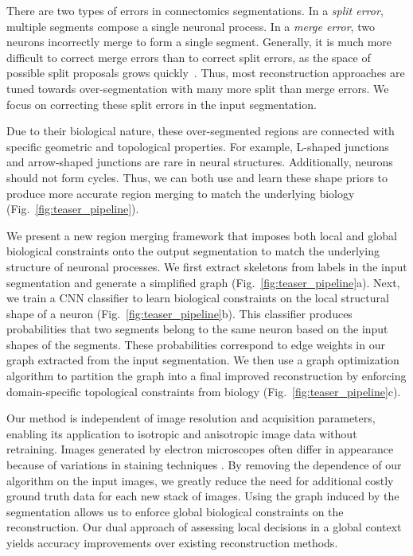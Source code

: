 There are two types of errors in connectomics segmentations.
In a \textit{split error}, multiple segments compose a single neuronal process. 
In a \textit{merge error}, two neurons incorrectly merge to form a single segment. 
Generally, it is much more difficult to correct merge errors than to correct split errors, as the space of possible split proposals grows quickly~\cite{parag2015properties}.
Thus, most reconstruction approaches are tuned towards over-segmentation with many more split than merge errors.
We focus on correcting these split errors in the input segmentation.

Due to their biological nature, these over-segmented regions are connected with specific geometric and topological properties. 
For example, L-shaped junctions and arrow-shaped junctions are rare in neural structures.
Additionally, neurons should not form cycles. 
Thus, we can both use and learn these shape priors to produce more accurate region merging to match the underlying biology (Fig.~\ref{fig:teaser_pipeline}).

We present a new region merging framework that imposes both local and global biological constraints onto the output segmentation to match the underlying structure of neuronal processes.
We first extract skeletons from labels in the input segmentation and generate a simplified graph (Fig.~\ref{fig:teaser_pipeline}a). 
Next, we train a CNN classifier to learn biological constraints on the local structural shape of a neuron (Fig.~\ref{fig:teaser_pipeline}b).
This classifier produces probabilities that two segments belong to the same neuron based on the input shapes of the segments.
These probabilities correspond to edge weights in our graph extracted from the input segmentation.
We then use a graph optimization algorithm to partition the graph into a final improved reconstruction by enforcing domain-specific topological constraints from biology (Fig.~\ref{fig:teaser_pipeline}c).


Our method is independent of image resolution and acquisition parameters, enabling its application to isotropic and anisotropic image data without retraining.
Images generated by electron microscopes often differ in appearance because of variations in staining techniques \cite{briggman2012volume}.
By removing the dependence of our algorithm on the input images, we greatly reduce the need for additional costly ground truth data for each new stack of images.
Using the graph induced by the segmentation allows us to enforce global biological constraints on the reconstruction. 
Our dual approach of assessing local decisions in a global context yields accuracy improvements over existing reconstruction methods.


